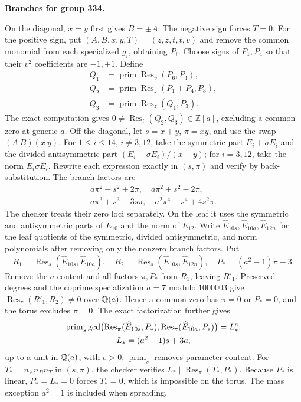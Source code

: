\documentclass[11pt]{amsart}
\newcommand{\topic}[1]{\par\addvspace{1.4ex}\noindent\textbf{#1}\par\nobreak\smallskip\noindent}
\newcommand{\Z}{\mathbb{Z}}
\theoremstyle{definition}\newtheorem{definition}[theorem]{Definition}\theoremstyle{remark}\newtheorem{remark}[theorem]{Remark}
\begin{document}
\topic{Branches for group 334.} On the diagonal, $x=y$ first gives $B=\pm A$. The negative sign forces $T=0$. For the positive sign, put $(A,B,x,y,T)=(z,z,t,t,v)$ and remove the common monomial from each specialized $g_i$, obtaining $P_i$. Choose signs of $P_1,P_4$ so that their $v^2$ coefficients are $-1,+1$. Define
\[
 \begin{aligned}
 Q_1&=\operatorname{prim}\operatorname{Res}_v(P_6,P_4),\\
 Q_2&=\operatorname{prim}\operatorname{Res}_z(P_1+P_4,P_3),\\
 Q_3&=\operatorname{prim}\operatorname{Res}_z(Q_1,P_3).
 \end{aligned}
\]
The exact computation gives $0\ne\operatorname{Res}_t(Q_2,Q_3)\in\Z[a]$, excluding a common zero at generic $a$. Off the diagonal, let $s=x+y$, $\pi=xy$, and use the swap $(A\ B)(x\ y)$. For $1\le i\le14$, $i\ne3,12$, take the symmetric part $E_i+\sigma E_i$ and the divided antisymmetric part $(E_i-\sigma E_i)/(x-y)$; for $i=3,12$, take the norm $E_i\sigma E_i$. Rewrite each expression exactly in $(s,\pi)$ and verify by back-substitution. The branch factors are
\[
 \begin{gathered}
 a\pi^2-s^2+2\pi,\quad a\pi^2+s^2-2\pi,\\
 a\pi^3+s^3-3s\pi,\quad a^2\pi^4-s^4+4s^2\pi.
 \end{gathered}
\]
The checker treats their zero loci separately. On the leaf it uses the symmetric and antisymmetric parts of $E_{10}$ and the norm of $E_{12}$. Write $\widehat E_{10s},\widehat E_{10a},\widehat E_{12n}$ for the leaf quotients of the symmetric, divided antisymmetric, and norm polynomials after removing only the nonzero branch factors. Put
\[
 R_1=\operatorname{Res}_s(\widehat E_{10s},\widehat E_{10a}),\quad
 R_2=\operatorname{Res}_s(\widehat E_{10s},\widehat E_{12n}),\quad
 P_*=(a^2-1)\pi-3.
\]
Remove the $a$-content and all factors $\pi,P_*$ from $R_1$, leaving $R'_1$. Preserved degrees and the coprime specialization $a=7$ modulo $1000003$ give $\operatorname{Res}_{\pi}(R'_1,R_2)\ne0$ over $\mathbb{Q}(a)$. Hence a common zero has $\pi=0$ or $P_*=0$, and the torus excludes $\pi=0$. The exact factorization further gives
\[
 \begin{gathered}
 \operatorname{prim}_s\gcd\bigl(\operatorname{Res}_{\pi}(\widehat E_{10s},P_*),\nobreak\operatorname{Res}_{\pi}(\widehat E_{10a},P_*)\bigr)=L_*^{e},\\
 L_*=(a^2-1)s+3a,
 \end{gathered}
\]
up to a unit in $\mathbb{Q}(a)$, with $e>0$; $\operatorname{prim}_s$ removes parameter content. For $T_*=n_An_Bn_T$ in $(s,\pi)$, the checker verifies $L_*\mid\operatorname{Res}_{\pi}(T_*,P_*)$. Because $P_*$ is linear, $P_*=L_*=0$ forces $T_*=0$, which is impossible on the torus. The mass exception $a^2=1$ is included when spreading.
\end{document}
